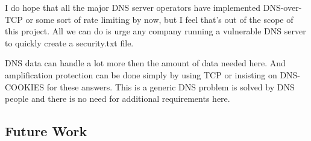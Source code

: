 I do hope that all the major DNS server operators have implemented DNS-over-TCP
or some sort of rate limiting by now, but I feel that's out of the scope of this
project. All we can do is urge any company running a vulnerable DNS server to
quickly create a security.txt file.

DNS data can handle a lot more then the amount of data needed here. And
amplification protection can be done simply by using TCP or insisting on
DNS-COOKIES for these answers. This is a generic DNS problem is solved by DNS
people and there is no need for additional requirements here.

\subsection{Future Work}

